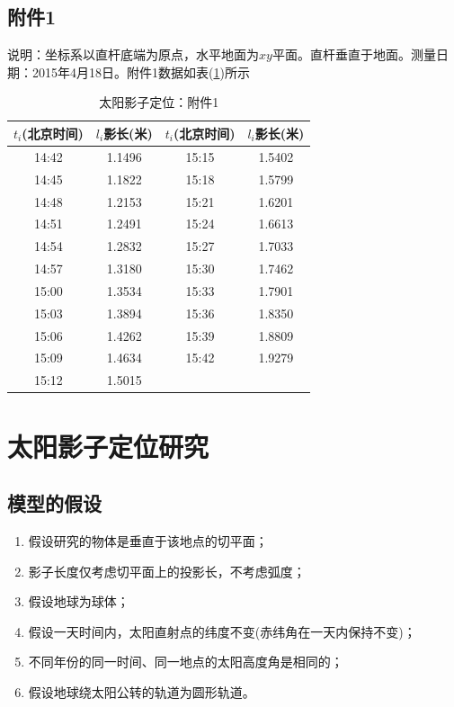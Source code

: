     \subsection{附件1}
        \par
        说明：坐标系以直杆底端为原点，水平地面为$xy$平面。直杆垂直于地面。测量日期：2015年4月18日。附件1数据如表(\ref{太阳影子定位：附件1})所示
        \begin{table}[H]
        \caption{太阳影子定位：附件1}
        \label{太阳影子定位：附件1}
        \centering
        \begin{tabular}{cc||cc}
        \toprule
        $t_i$(北京时间) & $l_i$影长(米) & $t_i$(北京时间) & $l_i$影长(米) \\
        \midrule
        14:42 &   1.1496 &  15:15 &  1.5402\\
        14:45 &   1.1822 &  15:18 &  1.5799\\
        14:48 &   1.2153 &  15:21 &  1.6201\\
        14:51 &   1.2491 &  15:24 &  1.6613\\
        14:54 &   1.2832 &  15:27 &  1.7033\\
        14:57 &   1.3180 &  15:30 &  1.7462\\
        15:00 &   1.3534 &  15:33 &  1.7901\\
        15:03 &   1.3894 &  15:36 &  1.8350\\
        15:06 &   1.4262 &  15:39 &  1.8809\\
        15:09 &   1.4634 &  15:42 &  1.9279\\
        15:12 &   1.5015 &    {}  &{} \\
        \bottomrule
        \end{tabular}
      \end{table}

\section{太阳影子定位研究}
    \subsection{模型的假设}
        \begin{enumerate}
        \item 假设研究的物体是垂直于该地点的切平面；
        \item 影子长度仅考虑切平面上的投影长，不考虑弧度；
        \item 假设地球为球体；
        \item 假设一天时间内，太阳直射点的纬度不变(赤纬角在一天内保持不变)；
        \item 不同年份的同一时间、同一地点的太阳高度角是相同的；
        \item 假设地球绕太阳公转的轨道为圆形轨道。
        \end{enumerate}
